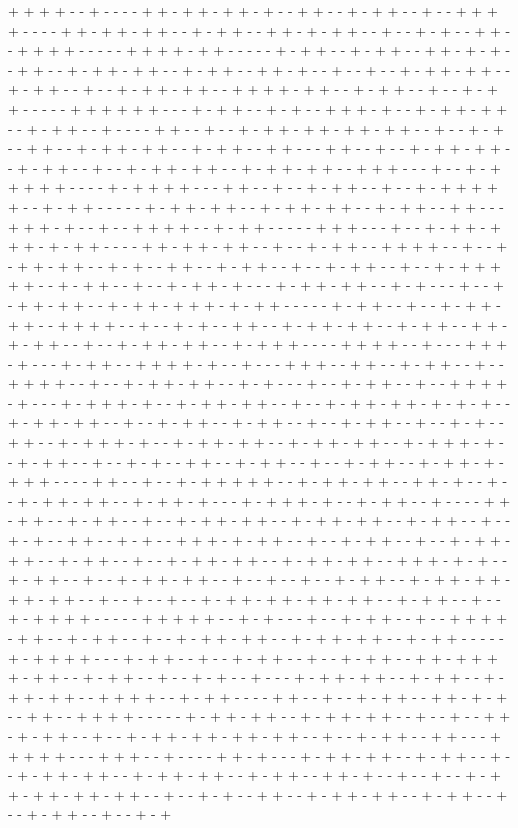 + + + + - - + - - - - + + - + + - + + - + - - + + - - + - + + - - + - - + + + + - - - - + + - + + - + + - - + - + + - - + + - + - + + - - + - - + - + - - + + - - + + + + - - - - - + + + + - + + - - - - - + - + + - - + - + + - - + + - + - + - - + + - - + - + + - + + - - + - + + - - + + - + - - + - - + - - + - + + - + + - - + - + + - - + - - + - + + - + + - - + + + + - + + - - + - + + - - + - - + - + + - - - - - + + + + + + - - - + - + + - - + - + - - + + + - + - - + - + + - + + - - + - + + - - + - - - - + + - - + - - + - + + - + + - + + - + + - - + - - + - + - - + + - - + - + + - + + - - + - + + - - + + - - - + + - - + - - + - + + - + + - - + - + + - - + - - + - + + - + + - - + - + + - + + - - + + + - - - + - - + - + + + + + - - - - + - + + + + - - - + + - - + - - + - + + - - + - - + - + + + + + - - + - + + - - - - - + - + + - + + - - + - + + - + + - - + - + + - - + + - - - + + + - + - - + - - + + + + - - + - + + - - - - - + + + - - - + - - + - + + - + + + - + - + + - - - - + + - + + - + + - - + - - + - + + - - + + + + - - + - - + - + + - + + - - + - + - - + + - - + - + + - - + - - + - + + - - + - - + - + + + + + - - + - + + - - + - - + - + + - + - - - + - + + - + + - - + - + - - - + - - + - + + - + + - - + - + + - + + + - + - + + - - - - - + - + + - - + - - + - + + - + + - - + + + + - - + - - + - + - - + + - - + - + + - + + - - + - + + - - + + - + - + + - - + - - + - + + - + + - - + - + + + - - - - + + + + - - + - - - + + + - + - - - + - + + - - + + + + - + - - + - - - + + + - - + + - - + - + + - - + - - + + + + - - + - - + - + + - + + - - + - + - - - + - - + - + + - - + - - + + + + - + - - - + - + + + - + - - + - + + - + + - - + - - + - + + - + + - + - + - + - - + - + + - + + - - + - - + - + + - - + - + + - - + - - + - + + - - + - - + - + - - + + - - + - + + + - + - - + - + + - + + - - + - + + - + + - - + - + + + - + - - + - + + - - + - - + - + - - + + - - + - + + - - + - - + - + + - - + - + + - + - + + + - - - - + + - - + - - + - + + + + + - - + - + + - + + - - + + - + - - + - - + - + + - + + - - + - + + - + - - - + - + + + - + - - + - + + - - + - - - - + + - + + - - + - + + - - + - - + - + + - + + - - + - + + - + + - - + - + + - - + - - + - + - - + + - - + - + - - + + + - + - + + - - + - - + - + + - - + - - + - + + - + + - - + - + + - - + - - + - + + - + + - - + - + + - + + - - + + + - + - + - - + - + + - - + - - + - + + - + + - - + - - + - - + - - + - + + - - + - + + - + + - + + - + + - - + - - + - - + - - + - + + - + + - + + - + + - - + - + + - - + - - + - + + + + - - - - - + + + + + - - + - + - - - + - - + - + + - - + - - + + + + - + + - - + - + + - - + - - + - + + - + + - - + - + + - + + - - + - + + - - - - - + - + + + + - - - + - + + - - + - - + - + + - - + - - + - + + - - + + - + + + + - + + - - + - + + - - + - - + - + - - + - - - + - + + - + + - - + - + + - - + - + + - + + - - + + + + - - + - + + - - - - + + - - + - - + - + + - - + + - + - + - - + + - - + + + + - - - - - + - + + - + + - - + - + + - + + - - + - - + - - + + - + - + + - - + - - + - + + - + + - + + - + + - - + - - + - + + - - + + - - - + + + + + - - - + + + - - + - - - - + + - + - - - + - + + - + + - - + - + + - - + - - + - + + - + + - - + - + + - + + - - + - + + - - + + - + - - + - - + - - + - + + - + + - + + - + + - - + - - + - + - - + + - - + - + + - + + - - + - + + - - + - - + - + + - - + - - + - + 